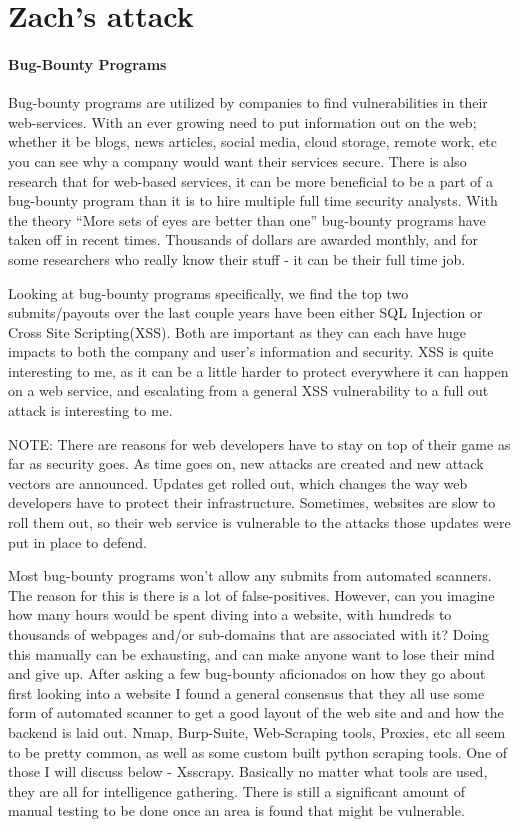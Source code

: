 \section{Zach's attack}
\paragraph{Bug-Bounty Programs}
Bug-bounty programs are utilized by companies to find vulnerabilities in their web-services.  With an ever growing need to put information out on the web; whether it be blogs, news articles, social media, cloud storage, remote work, etc you can see why a company would want their services secure. There is also research that for web-based services, it can be more beneficial to be a part of a bug-bounty program than it is to hire multiple full time security analysts.  With the theory “More sets of eyes are better than one” bug-bounty programs have taken off in recent times.  Thousands of dollars are awarded monthly, and for some researchers who really know their stuff - it can be their full time job.

Looking at bug-bounty programs specifically, we find the top two submits/payouts over the last couple years have been either SQL Injection or Cross Site Scripting(XSS).  Both are important as they can each have huge impacts to both the company and user’s information and security.  XSS is quite interesting to me, as it can be a little harder to protect everywhere it can happen on a web service, and escalating from a general XSS vulnerability to a full out attack is interesting to me.


NOTE: There are reasons for web developers have to stay on top of their game as far as security goes.  As time goes on, new attacks are created and new attack vectors are announced.  Updates get rolled out, which changes the way web developers have to protect their infrastructure. Sometimes, websites are slow to roll them out, so their web service is vulnerable to the attacks those updates were put in place to defend.

Most bug-bounty programs won’t allow any submits from automated scanners.  The reason for this is there is a lot of false-positives.  However, can you imagine how many hours would be spent diving into a website, with hundreds to thousands of webpages and/or sub-domains that are associated with it?  Doing this manually can be exhausting, and can make anyone want to lose their mind and give up.  After asking a few bug-bounty aficionados on how they go about first looking into a website I found a general consensus that they all use some form of automated scanner to get a good layout of the web site and and how the backend is laid out. Nmap, Burp-Suite, Web-Scraping tools, Proxies, etc all seem to be pretty common, as well as some custom built python scraping tools.  One of those I will discuss below - Xsscrapy.  Basically no matter what tools are used, they are all for intelligence gathering.  There is still a significant amount of manual testing to be done once an area is found that might be vulnerable.

